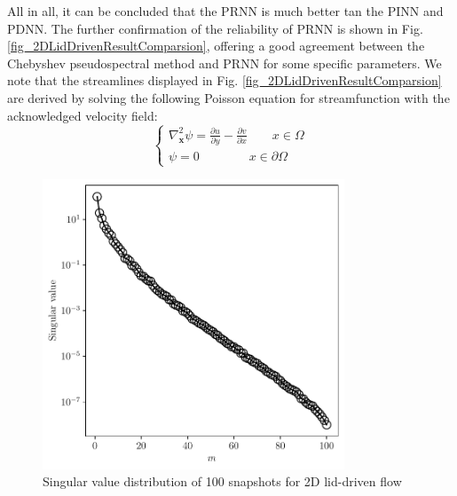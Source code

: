 \documentclass[preprint, 10pt]{elsarticle}
\begin{document}
All in all, it can be concluded that the PRNN is much better tan the PINN and PDNN. The further confirmation of the reliability of PRNN is shown in Fig. \ref{fig_2DLidDrivenResultComparsion}, offering a good agreement between the Chebyshev pseudospectral method and PRNN for some specific parameters. We note that the streamlines displayed in Fig. \ref{fig_2DLidDrivenResultComparsion} are derived by solving the following Poisson equation for streamfunction  with the acknowledged velocity field:
\begin{equation}
\left \{
\begin{aligned}
{\nabla_{\mathbf{x}} ^2}{\psi}
 = \frac{\partial u}{\partial y} - \frac{\partial v}{\partial x} \qquad x \in \Omega\\
\psi = 0  \qquad \qquad    x \in \partial \Omega
\end{aligned}
 \right .
\label{eq_Streamfunction}
\end{equation}

\begin{figure}[!ht]
  \centering
  \includegraphics[width=9cm]{../../pythonNN/2DLidDriven/fig/SingularValues_100.pdf}
\caption{Singular value distribution of 100 snapshots for 2D lid-driven flow}
\label{fig_2DLidDrivenSingularValues}
\end{figure}
\end{document}
